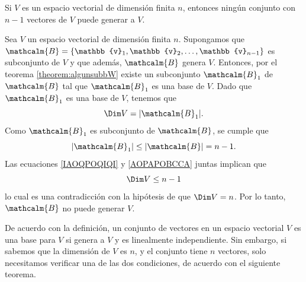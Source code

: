 \newpage

\begin{theorem}{}{}
    Si $V$ es un espacio vectorial de dimensión finita $n$, entonces ningún conjunto con $n - 1$ vectores de $V$ puede generar a $V$.

    \tcblower
    \demostracion Sea $V$ un espacio vectorial de dimensión finita $n$. Supongamos que $\mathcalm{B} = \{\mathbb{v}_1, \mathbb{v}_2, \dots, \mathbb{v}_{n-1}\}$ es subconjunto de $V$ y que además, $\mathcalm{B}$ genera $V$. Entonces, por el teorema \ref{theorem:algunsubbW} existe un subconjunto $\mathcalm{B}_1$ de $\mathcalm{B}$ tal que $\mathcalm{B}_1$ es una base de $V$. Dado que $\mathcalm{B}_1$ es una base de $V$, tenemos que
    \begin{equation}
        \Dim V = |\mathcalm{B}_1|. \label{IAOQPOQIQI}
    \end{equation}
    Como $\mathcalm{B}_1$ es subconjunto de $\mathcalm{B}$, se cumple que
    \begin{equation}
        |\mathcalm{B}_1| \leq |\mathcalm{B}| = n - 1. \label{AOPAPOBCCA}
    \end{equation}
    Las ecuaciones \eqref{IAOQPOQIQI} y \eqref{AOPAPOBCCA} juntas implican que
    $$\Dim V \leq n - 1 $$
    lo cual es una contradicción con la hipótesis de que $\Dim V = n$. Por lo tanto, $\mathcalm{B}$ no puede generar $V$.
\end{theorem}

De acuerdo con la definición, un conjunto de vectores en un espacio vectorial $V$ es una base para $V$ si genera a $V$ y es linealmente independiente. Sin embargo, si sabemos que la dimensión de $V$ es $n$, y el conjunto tiene $n$ vectores, solo necesitamos verificar una de las dos condiciones, de acuerdo con el siguiente teorema.

